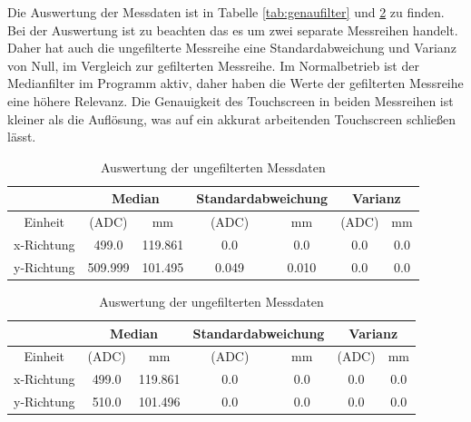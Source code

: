 Die Auswertung der Messdaten ist in Tabelle \ref{tab:genaufilter} und \ref{tab:genauunfilter} zu finden.
Bei der Auswertung ist zu beachten das es um zwei separate Messreihen handelt. Daher hat auch die ungefilterte Messreihe eine Standardabweichung und Varianz von Null, im Vergleich zur gefilterten Messreihe.
Im Normalbetrieb ist der Medianfilter im Programm aktiv, daher haben die Werte der gefilterten Messreihe eine höhere Relevanz. 
Die Genauigkeit des Touchscreen in beiden Messreihen ist kleiner als die Auflösung, was auf ein akkurat arbeitenden Touchscreen schließen lässt.
\begin{table}[ht!]
    \caption{Auswertung der gefilterten Messdaten }
    \begin{center}
        \begin{tabular}{ |c|c|c|c|c|c|c| }
          \hline&\multicolumn{2}{c|}{Median}& \multicolumn{2}{c|}{Standardabweichung}&\multicolumn{2}{c|}{Varianz} \\ \hline
         Einheit    &(ADC)              &mm             &(ADC)          &mm             &(ADC)      &mm\\\hline
         x-Richtung & \SI{499,0}{}      & \SI{119,861}{}&\SI{0,0}{}     &\SI{0,0}{}     &\SI{0,0}{} & \SI{0,0}{} \\  \hline
         y-Richtung & \SI{509,999}{}    & \SI{101,495}{}&\SI{0,049}{}   &\SI{0,010}{}   &\SI{0,0}{} & \SI{0,0}{} \\ \hline  
        \end{tabular}
        \label{tab:genaufilter}
    \end{center}   
    \caption{Auswertung der ungefilterten Messdaten}
    \begin{center}
        \begin{tabular}{ |c|c|c|c|c|c|c| }
          \hline&\multicolumn{2}{c|}{Median}& \multicolumn{2}{c|}{Standardabweichung}&\multicolumn{2}{c|}{Varianz} \\ \hline
          Einheit &(ADC)&mm&(ADC)&mm&(ADC)&mm\\\hline
          x-Richtung & \SI{499,0}{} & \SI{119,861}{}&\SI{0,0}{}&\SI{0,0}{}&\SI{0,0}{} & \SI{0,0}{} \\  \hline
          y-Richtung & \SI{510,0}{} & \SI{101,496}{}&\SI{0,0}{}&\SI{0,0}{}&\SI{0,0}{} & \SI{0,0}{} \\ \hline  
        \end{tabular}
        \label{tab:genauunfilter}
    \end{center}   
\end{table}


